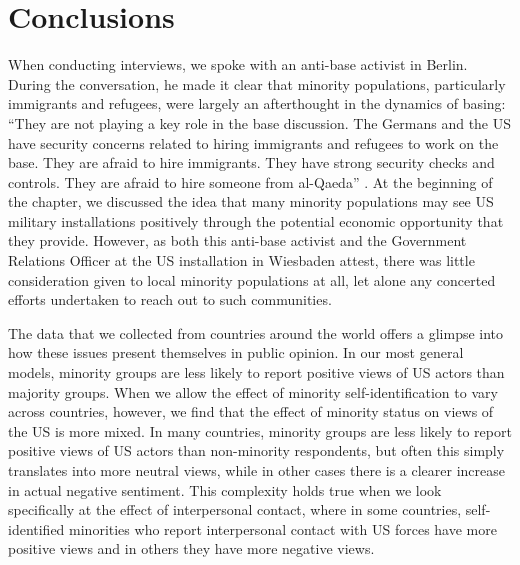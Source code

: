 \section*{Conclusions}

When conducting interviews, we spoke with an anti-base activist in Berlin. During the conversation, he made it clear that minority populations, particularly immigrants and refugees, were largely an afterthought in the dynamics of basing: ``They are not playing a key role in the base discussion. The Germans and the US have security concerns related to hiring immigrants and refugees to work on the base. They are afraid to hire immigrants. They have strong security checks and controls. They are afraid to hire someone from al-Qaeda'' \cite{berlinone20190723}. At the beginning of the chapter, we discussed the idea that many minority populations may see US military installations positively through the potential economic opportunity that they provide. However, as both this anti-base activist and the Government Relations Officer at the US installation in Wiesbaden attest, there was little consideration given to local minority populations at all, let alone any concerted efforts undertaken to reach out to such communities. 


The data that we collected from countries around the world offers a glimpse into how these issues present themselves in public opinion. In our most general models, minority groups are less likely to report positive views of US actors than majority groups. When we allow the effect of minority self-identification to vary across countries, however, we find that the effect of minority status on views of the US is more mixed. In many countries, minority groups are less likely to report positive views of US actors than non-minority respondents, but often this simply translates into more neutral views, while in other cases there is a clearer increase in actual negative sentiment. This complexity holds true when we look specifically at the effect of interpersonal contact, where in some countries, self-identified minorities who report interpersonal contact with US forces have more positive views and in others they have more negative views. 


